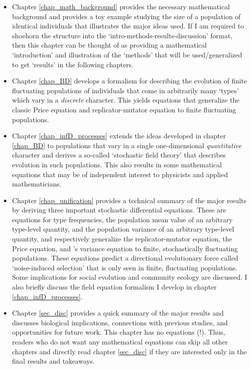 \begin{itemize}
		\item Chapter \ref{chap_math_background} provides the necessary mathematical background and provides a toy example studying the size of a population of identical individuals that illustrates the major ideas used. If I am required to shoehorn the structure into the `intro-methods-results-discussion' format, then this chapter can be thought of as providing a mathematical `introduction' and illustration of the `methods' that will be used/generalized to get `results' in the following chapters.
		\item Chapter \ref{chap_BD} develops a formalism for describing the evolution of finite fluctuating populations of individuals that come in arbitrarily many `types' which vary in a \emph{discrete} character. This yields equations that generalize the classic Price equation and replicator-mutator equation to finite fluctuating populations.
		\item Chapter \ref{chap_infD_processes} extends the ideas developed in chapter \ref{chap_BD} to populations that vary in a single one-dimensional \emph{quantitative} character and derives a so-called `stochastic field theory' that describes evolution in such populations. This also results in some mathematical equations that may be of independent interest to physicists and applied mathematicians.
		\item Chapter \ref{chap_unification} provides a technical summary of the major results by deriving three important stochastic differential equations. These are equations for type frequencies, the population mean value of an arbitrary type-level quantity, and the population variance of an arbitrary type-level quantity, and respectively generalize the replicator-mutator equation, the Price equation, and \cite{lion_theoretical_2018}'s variance equation to finite, stochastically fluctuating populations. These equations predict a directional evolutionary force called `noise-induced selection' that is only seen in finite, fluctuating populations. Some implications for social evolution and community ecology are discussed. I also briefly discuss the field equation formalism I develop in chapter \ref{chap_infD_processes}.
		\item Chapter \ref{sec_disc} provides a quick summary of the major results and discusses biological implications, connections with previous studies, and opportunities for future work. This chapter has no equations (!). Thus, readers who do not want any mathematical equations can skip all other chapters and directly read chapter \ref{sec_disc} if they are interested only in the final results and takeaways. 
\end{itemize}

